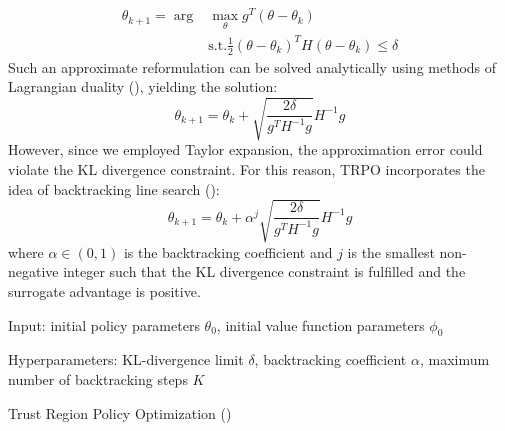 \begin{align*}
  \theta_{k+1} = \arg &\max_\theta g^T(\theta - \theta_k)   \\  
  &\text{s.t.}  \frac{1}{2} (\theta-\theta_k)^TH(\theta-\theta_k) \leq \delta
\end{align*}
Such an approximate reformulation can be solved analytically using methods of Lagrangian duality (\cite{LagrangDuality}), yielding the solution:
\[\theta_{k+1} = \theta_k + \sqrt{\frac{2\delta}{g^TH^{-1}g}}H^{-1}g\]
However, since we employed Taylor expansion, the approximation error could violate the KL divergence constraint.
For this reason, TRPO incorporates the idea of backtracking line search (\cite{BacktrackingLineSearch}):
\[\theta_{k+1} = \theta_k + \alpha^j \sqrt{\frac{2\delta}{g^TH^{-1}g}}H^{-1}g\]
where $\alpha \in (0,1)$ is the backtracking coefficient and $j$ is the smallest non-negative integer such that the KL divergence constraint is fulfilled and the surrogate advantage is positive.

\begin{algorithm}[H]
  Input: initial policy parameters $\theta_0$, initial value function parameters $\phi_0$

  Hyperparameters: KL-divergence limit $\delta$, backtracking coefficient $\alpha$, maximum number of backtracking steps $K$
  
  
  \caption{Trust Region Policy Optimization (\cite{SpinningUpIntro})}
  \label{TRPO}
\end{algorithm}


